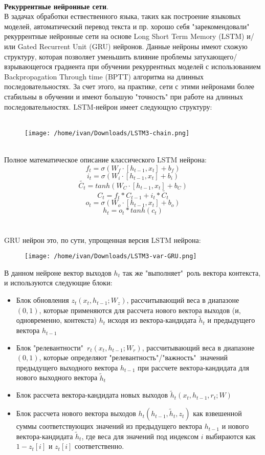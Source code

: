 \documentclass[11pt]{article}
\begin{document}
\\
\textbf{Рекуррентные нейронные сети}.
\\
В задачах обработки ествественного языка, таких как построение языковых моделей, автоматический перевод текста и пр. хорошо себя "зарекомендовали" рекуррентные нейронные сети на основе Long Short Term Memory (LSTM) и/или Gated Recurrent Unit (GRU) нейронов. Данные нейроны имеют схожую структуру, которая позволяет уменьшить влияние проблемы затухающего/взрывающегося градиента при обучении рекуррентных моделей с использованием Backpropagation Through time (BPTT) алгоритма на длинных последовательностях. За счет этого, на практике, сети с этими нейронами более стабильны в обучении и имеют большую "точность" при работе на длинных последовательностях. LSTM-нейрон имеет следующую структуру:
\\
\\
\begin{figure}[h]
\centering
\texttt{[image: /home/ivan/Downloads/LSTM3-chain.png]}
\label{}
\end{figure}
\\
Полное математическое описание классического LSTM нейрона:
$$ f_t = \sigma( W_f \cdot [h_{t-1},x_t] + b_f) $$
$$ i_t = \sigma( W_i \cdot [h_{t-1},x_t] + b_i) $$
$$ \tilde{C_t} = tanh( W_C \cdot [h_{t-1},x_t] + b_C) $$
$$ C_t = f_t * C_{t-1} + i_t * \tilde{C_t} $$
$$ o_t = \sigma( W_o \cdot [h_{t-1},x_t] + b_o) $$
$$ h_t = o_t * tanh(c_t) $$
\\
\\
GRU нейрон это, по сути, упрощенная версия LSTM нейрона:
\begin{figure}[H]
\centering
\texttt{[image: /home/ivan/Downloads/LSTM3-var-GRU.png]}
\label{}
\end{figure}
В данном нейроне вектор выходов $h_t$ так же "выполняет"\ роль вектора контекста, и используются следующие блоки:
\begin{itemize}
\item Блок обновления $z_t(x_t,h_{t-1};W_z)$, рассчитывающий веса в диапазоне $(0,1)$, которые применяются для рассчета нового вектора выходов (и, одновременно, контекста) $h_t$ исходя из вектора-кандидата $\tilde{h}_t$ и предыдущего вектора $h_{t-1}$
\item Блок "релевантности"\ $r_t(x_t,h_{t-1};W_r)$, рассчитывающий веса в диапазоне $(0,1)$, которые определяют "релевантность"/"важность"\ значений предыдущего выходного вектора $h_{t-1}$ при рассчете вектора-кандидата для нового выходного вектора $\tilde{h}_t$
\item Блок рассчета вектора-кандидата новых выходов $\tilde{h}_t(x_t,h_{t-1},r_t;W)$
\item Блок рассчета нового вектора выходов $h_t(h_{t-1},\tilde{h}_t,z_t)$ как взвешенной суммы соответствующих значений из предыдущего вектора $h_{t-1}$ и нового вектора-кандидата $\tilde{h}_t$, где веса для значений под индексом $i$ выбираются как $1-z_t[i]$ и $z_t[i]$ соответственно.
\end{itemize}
\end{document}
